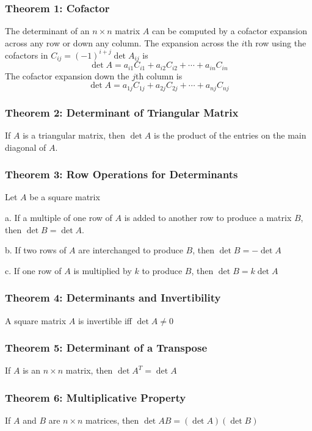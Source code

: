 \documentclass{article}
\begin{document}
\subsubsection*{Theorem 1: Cofactor}
The determinant of an $n \times n$ matrix $A$ can be computed by a cofactor expansion across any row or down any column. The expansion across the $i$th row using the cofactors in $C_{ij} = (-1)^{i+j} \det A_{ij}$ is
$$\det A = a_{i1} C_{i1} + a_{i2} C_{i2} + \cdots + a_{in} C_{in}$$
The cofactor expansion down the $j$th column is 
$$\det A = a_{1j} C_{1j} + a_{2j} C_{2j} + \cdots + a_{nj} C_{nj}$$

\subsubsection*{Theorem 2: Determinant of Triangular Matrix}
If $A$ is a triangular matrix, then $\det A$ is the product of the entries on the main diagonal of $A$. 

\subsubsection*{Theorem 3: Row Operations for Determinants}
Let $A$ be a square matrix

a. If a multiple of one row of $A$ is added to another row to produce a matrix \indent $B$, then $\det B = \det A$. 

b. If two rows of $A$ are interchanged to produce $B$, then $\det B = -\det A$

c. If one row of $A$ is multiplied by $k$ to produce $B$, then $\det B = k \det A$

\subsubsection*{Theorem 4: Determinants and Invertibility}
A square matrix $A$ is invertible iff $\det A \neq 0$

\subsubsection*{Theorem 5: Determinant of a Transpose}
If $A$ is an $n \times n$ matrix, then $\det A^T = \det A$

\subsubsection*{Theorem 6: Multiplicative Property}
If $A$ and $B$ are $n \times n$ matrices, then $\det AB = (\det A)(\det B)$
\end{document}
